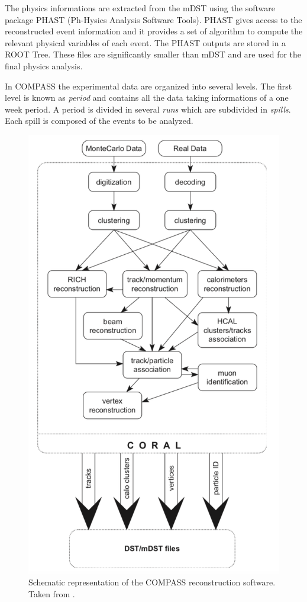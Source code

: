 The physics informations are extracted from the mDST using the software package PHAST (Ph-Hysics Analysis Software Tools). PHAST gives access to the reconstructed event information and it provides
a set of algorithm to compute the relevant physical variables of each event. The PHAST outputs are stored in a ROOT Tree. These files are significantly smaller than mDST and are used for the final
physics analysis.

In COMPASS the experimental data are organized into several levels. The first level is known as \textit{period} and contains all the data taking informations of a one week period. A period is
divided in several \textit{runs} which are subdivided in \textit{spills}. Each spill is composed of the events to be analyzed.

\begin{figure}[!h]
  \centering
	\includegraphics[scale=0.55]{./gfx/CORAL.png}
	\caption{Schematic representation of the COMPASS reconstruction software. Taken from \cite{NIM}.}
	\label{pic:CORAL}
\end{figure}
